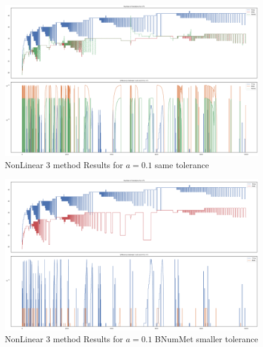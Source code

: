 \begin{figure}
    \centering
    \includegraphics[width=\textwidth]{Include/Images/Thesis/Analysis of Solutions/NonLinear AS/NonLinear 3 method Results a-0.1.png}
    \caption{NonLinear 3 method Results for $a=0.1$ same tolerance}
    \label{fig:NonLinear 3 method Results for a=0.1 same tolerance}
\end{figure}

\begin{figure}
    \centering
    \includegraphics[width=\textwidth]{Include/Images/Thesis/Analysis of Solutions/NonLinear AS/NonLinear 3 method Results Small Tol Bnum a-0.1.png}
    \caption{NonLinear 3 method Results for $a=0.1$ BNumMet smaller tolerance}
    \label{fig:NonLinear 3 method Results for a=0.1 BNumMet smaller tolerance}
\end{figure}